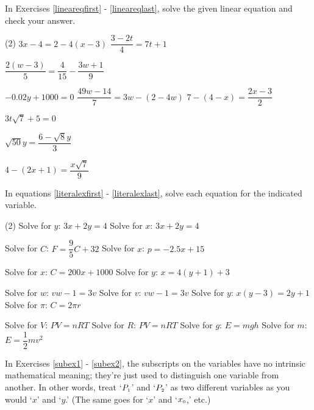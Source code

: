 \label{ExercisesforAppLinearEqIneq}

In Exercises \ref{lineareqfirst} - \ref{lineareqlast}, solve the given linear equation and check your answer.  

\begin{tasks}(2)
\task $3x - 4 = 2 - 4(x-3)$\label{lineareqfirst} 
\task $\dfrac{3 - 2t}{4} = 7t+1$

\task  $\dfrac{2(w-3)}{5} = \dfrac{4}{15} - \dfrac{3w+1}{9}$ 

\task  $-0.02y + 1000 = 0$  
\task  $\dfrac{49w - 14}{7}= 3w - (2-4w)$ 
\task  $7 - (4-x) = \dfrac{2x-3}{2}$  

\task $3 t\sqrt{7}  + 5 = 0$  

\task  $\sqrt{50} y = \dfrac{6 - \sqrt{8} y}{3}$  

\task  $4 - (2x+1) = \dfrac{x \sqrt{7}}{9}$ \label{lineareqlast} 
\end{tasks}

In equations \ref{literalexfirst} - \ref{literalexlast}, solve each equation for the indicated variable.

\begin{tasks}[resume](2)
\task  Solve for $y$:  $3x+2y = 4$  \label{literalexfirst}
\task  Solve for $x$:  $3x+2y = 4$ 

\task  Solve for $C$: $F = \dfrac{9}{5} C + 32$
\task  Solve for $x$:  $p = -2.5x + 15$ 

\task  Solve for $x$: $C = 200x + 1000$ 
\task  Solve for $y$:  $x= 4(y+1) + 3$ 

\task  Solve for $w$:  $vw - 1 = 3v$ 
\task  Solve for $v$:   $vw - 1 = 3v$
\task Solve for $y$:  $x(y-3) = 2y+1$
\task Solve for $\pi$:  $C = 2\pi r$

\task Solve for $V$:   $PV = nRT$
\task Solve for $R$:  $PV = nRT$
\task Solve for $g$:   $E = mgh$ 
\task Solve for $m$:  $E = \dfrac{1}{2} mv^2$
\end{tasks}

In Exercises \ref{subex1} - \ref{subex2}, the subscripts on the variables have no intrinsic mathematical meaning; they're just used to distinguish one variable from another.  In other words, treat `$P_{\text{\tiny $1$}}$' and `$P_{\text{\tiny $2$}}$'  as two different variables as you would `$x$' and `$y$.'  (The same goes for `$x$' and `$x_{\text{\tiny $0$}}$,'  etc.)

